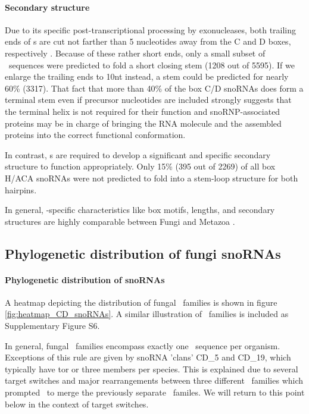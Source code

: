 \paragraph{\textbf{Secondary structure}} Due to its specific
post-transcriptional processing by exonucleases, both trailing ends of \cd
s are cut not farther than 5 nucleotides away from the C and D boxes,
respectively \citep{Kishore:2013}. Because of these rather short ends, only
a small subset of \sno\ sequences were predicted to fold a short closing
stem (1208 out of 5595).  If we enlarge the trailing ends to 10nt instead,
a stem could be predicted for nearly 60\% (3317). That fact that more than
40\% of the box C/D snoRNAs does form a terminal stem even if precursor
nucleotides are included strongly suggests that the terminal helix is not
required for their function and snoRNP-associated proteins may be in charge
of bringing the RNA molecule and the assembled proteins into the correct
functional conformation.

In contrast, \haca s are required to develop a significant and
specific secondary structure to function appropriately. Only 15\% (395
out of 2269) of all box H/ACA snoRNAs were not predicted to fold into a
stem-loop structure for both hairpins. 


In general, \sno -specific characteristics like box motifs, lengths,
and secondary structures are highly comparable between Fungi and
Metazoa \cite{Kehr:2014}.

\subsection{Phylogenetic distribution of fungi snoRNAs}
  
\paragraph{\textbf{Phylogenetic distribution of snoRNAs}}
A heatmap depicting the distribution of fungal \cd\ families is shown in
figure \ref{fig:heatmap_CD_snoRNAs}. A similar illustration of \haca\
families  is included as Supplementary Figure
S6. 

In general, fungal \sno\ families encompass exactly one \sno\ sequence per
organism. Exceptions of this rule are given by snoRNA 'clans' CD\_5 and
CD\_19, which typically have tor or three members per species.  This is
explained due to several target switches and major rearrangements between
three different \sno\ families which prompted \snostrip\ to merge the
previously separate \sno\ familes. We will return to this point below in
the context of target switches. 

